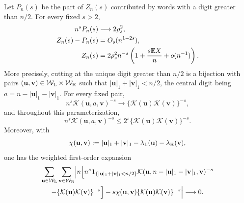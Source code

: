 \begin{proposition}
\label{prop:brocot-context-estimates}
Let \(P_n(s)\) be the part of \(Z_n(s)\) contributed by words with a digit
greater than \(n/2\).  For every fixed \(s>2\),
\begin{align}
 n^sP_n(s)&\longrightarrow2\rho_s^2,
 \label{eq:principal-large-digit-limit}\\
 Z_n(s)-P_n(s)&=O_s(n^{1-2s}),
 \label{eq:noncondensed-negligible}\\
 Z_n(s)&=2\rho_s^2n^{-s}
 \left(1+\frac{s\mathbb{E} X}{n}+o(n^{-1})\right).
 \label{eq:brocot-partition-asymptotic}
\end{align}
More precisely, cutting at the unique digit greater than \(n/2\) is a
bijection with pairs
\((\mathbf u,\mathbf v)\in\mathcal W_{\rm L}\times\mathcal W_{\rm R}\)
such that \(|\mathbf u|_1+|\mathbf v|_1<n/2\), the central digit being
\(a=n-|\mathbf u|_1-|\mathbf v|_1\).  For every fixed pair,
\begin{equation}
 n^s\mathcal K(\mathbf u,a,\mathbf v)^{-s}
 \longrightarrow
 \{\mathcal K(\mathbf u)\mathcal K(\mathbf v)\}^{-s},
 \label{eq:fixed-context-limit}
\end{equation}
and throughout this parameterization,
\begin{equation}
 n^s\mathcal K(\mathbf u,a,\mathbf v)^{-s}
 \le2^s\{\mathcal K(\mathbf u)\mathcal K(\mathbf v)\}^{-s}.
 \label{eq:summable-context-domination}
\end{equation}
Moreover, with
\begin{equation}
 \chi(\mathbf u,\mathbf v):=
 |\mathbf u|_1+|\mathbf v|_1
 -\lambda_{\rm L}(\mathbf u)-\lambda_{\rm R}(\mathbf v),
 \label{eq:deterministic-context-first-order-variable}
\end{equation}
one has the weighted first-order expansion
\begin{multline}
 \sum_{\mathbf u\in\mathcal W_{\rm L}}
 \sum_{\mathbf v\in\mathcal W_{\rm R}}
 \Bigl|n\Bigl[
  n^s\mathbf1_{\{|\mathbf u|_1+|\mathbf v|_1<n/2\}}
  \mathcal K(\mathbf u,n-|\mathbf u|_1-|\mathbf v|_1,\mathbf v)^{-s}\\
  -\{\mathcal K(\mathbf u)\mathcal K(\mathbf v)\}^{-s}\Bigr]
 -s\chi(\mathbf u,\mathbf v)
  \{\mathcal K(\mathbf u)\mathcal K(\mathbf v)\}^{-s}\Bigr|
 \longrightarrow0.
 \label{eq:weighted-context-first-order-expansion}
\end{multline}
\end{proposition}

